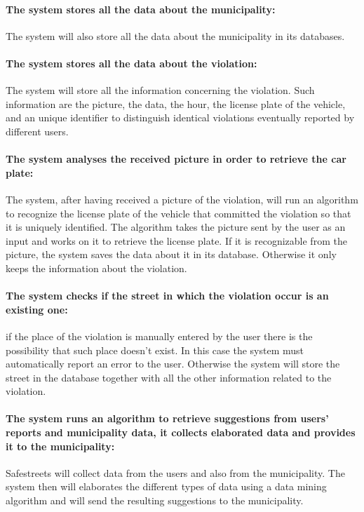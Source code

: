 \documentclass[titlepage]{article}
\begin{document}
\paragraph{The system stores all the data about the 					municipality:}
The system will also store all the data about the municipality in its databases.
\paragraph{The system stores all the data about the violation: }
The system will store all the information concerning the violation. Such information are the picture, the data, the hour, the license plate of the vehicle, and an unique identifier to distinguish identical violations eventually reported by different users.
\paragraph{The system analyses the received picture in order to 	retrieve the car plate: }
The system, after having received a picture of the violation, will run an algorithm to recognize the license plate of the vehicle that committed the violation so that it is uniquely identified. The algorithm takes the picture sent by the user as an input and works on it to retrieve the license plate. If it is recognizable from the picture, the system saves the data about it in its database. Otherwise it only keeps the information about the violation.
\paragraph{The system checks if the street in which the 				violation occur is an existing one: }
if the place of the violation is manually entered by the user there is the possibility that such place doesn't exist. In this case the system must automatically report an error to the user. Otherwise the system will store the street in the database together with all the other information related to the violation.
\paragraph{The system runs an algorithm to retrieve suggestions from users' reports and municipality data, it collects elaborated data and provides it to the municipality: }
Safestreets will collect data from the users and also from the municipality. The system then will elaborates the different types of data using a data mining algorithm and will send the resulting suggestions to the municipality. 
\end{document}
